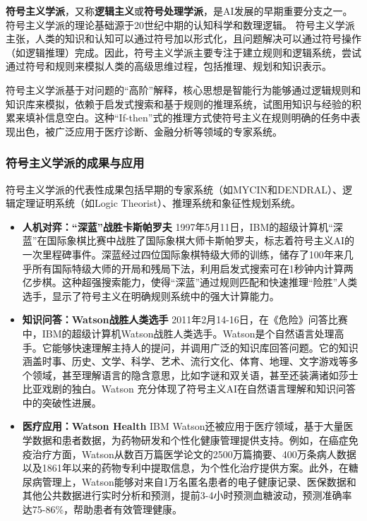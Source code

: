 {\bf 符号主义学派}，又称{\bf 逻辑主义}或{\bf 符号处理学派}，是AI发展的早期重要分支之一。符号主义学派的理论基础源于20世纪中期的认知科学和数理逻辑。
符号主义学派主张，人类的知识和认知可以通过符号加以形式化，且问题解决可以通过符号操作（如逻辑推理）完成。因此，符号主义学派主要专注于建立规则和逻辑系统，尝试通过符号和规则来模拟人类的高级思维过程，包括推理、规划和知识表示。

符号主义学派基于对问题的“高阶”解释，核心思想是智能行为能够通过逻辑规则和知识库来模拟，依赖于启发式搜索和基于规则的推理系统，试图用知识与经验的积累来填补信息空白。这种“If-then”式的推理方式使符号主义在规则明确的任务中表现出色，被广泛应用于医疗诊断、金融分析等领域的专家系统。

\subsubsection*{符号主义学派的成果与应用}
符号主义学派的代表性成果包括早期的专家系统（如MYCIN和DENDRAL）、逻辑定理证明系统（如Logic Theorist）、推理系统和象征性规划系统。

\begin{itemize}
\item {\bf 人机对弈：“深蓝”战胜卡斯帕罗夫}  
  1997年5月11日，IBM的超级计算机“深蓝”在国际象棋比赛中战胜了国际象棋大师卡斯帕罗夫，标志着符号主义AI的一次里程碑事件。深蓝经过四位国际象棋特级大师的训练，储存了100年来几乎所有国际特级大师的开局和残局下法，利用启发式搜索可在1秒钟内计算两亿步棋。这种超强搜索能力，使得“深蓝”通过规则匹配和快速推理“险胜”人类选手，显示了符号主义在明确规则系统中的强大计算能力。
  
\item {\bf 知识问答：Watson战胜人类选手}  
 2011年2月14-16日，在《危险》问答比赛中，IBM的超级计算机Watson战胜人类选手。Watson是个自然语言处理高手。它能够快速理解主持人的提问，并调用广泛的知识库回答问题。它的知识涵盖时事、历史、文学、科学、艺术、流行文化、体育、地理、文字游戏等多个领域，甚至理解语言的隐含意思，比如字谜和双关语，甚至还装满诸如莎士比亚戏剧的独白。Watson 充分体现了符号主义AI在自然语言理解和知识问答中的突破性进展。  

\item {\bf 医疗应用：Watson Health}  
  IBM Watson还被应用于医疗领域，基于大量医学数据和患者数据，为药物研发和个性化健康管理提供支持。例如，在癌症免疫治疗方面，Watson从数百万篇医学论文的2500万篇摘要、400万条病人数据以及1861年以来的药物专利中提取信息，为个性化治疗提供方案。此外，在糖尿病管理上，Watson能够对来自1万名匿名患者的电子健康记录、医保数据和其他公共数据进行实时分析和预测，提前3-4小时预测血糖波动，预测准确率达75-86\%，帮助患者有效管理健康。
\end{itemize}

